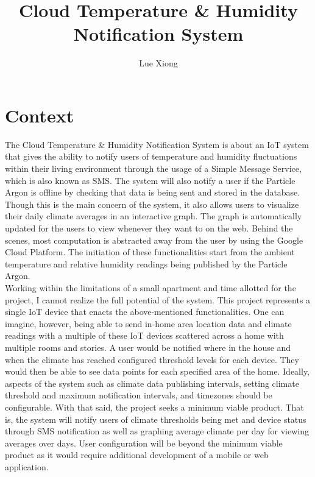 \documentclass{article}
\title{Cloud Temperature \& Humidity Notification System}
\author{Lue Xiong}
\begin{document}
\maketitle
\newpage

\tableofcontents
\newpage

\obeylines

\section{Context}
The Cloud Temperature \& Humidity Notification System is about an IoT system that gives the ability to notify users of temperature and humidity fluctuations within their living environment through the usage of a Simple Message Service, which is also known as SMS. The system will also notify a user if the Particle Argon is offline by checking that data is being sent and stored in the database. Though this is the main concern of the system, it also allows users to visualize their daily climate averages in an interactive graph. The graph is automatically updated for the users to view whenever they want to on the web. Behind the scenes, most computation is abstracted away from the user by using the Google Cloud Platform. The initiation of these functionalities start from the ambient temperature and relative humidity readings being published by the Particle Argon.\\

Working within the limitations of a small apartment and time allotted for the project, I cannot realize the full potential of the system. This project represents a single IoT device that enacts the above-mentioned functionalities. One can imagine, however, being able to send in-home area location data and climate readings with a multiple of these IoT devices scattered across a home with multiple rooms and stories. A user would be notified where in the house and when the climate has reached configured threshold levels for each device. They would then be able to see data points for each specified area of the home. Ideally, aspects of the system such as climate data publishing intervals, setting climate threshold and maximum notification intervals, and timezones should be configurable. With that said, the project seeks a minimum viable product. That is, the system will notify users of climate thresholds being met and device status through SMS notification as well as graphing average climate per day for viewing averages over days. User configuration will be beyond the minimum viable product as it would require additional development of a mobile or web application.\\
\end{document}
